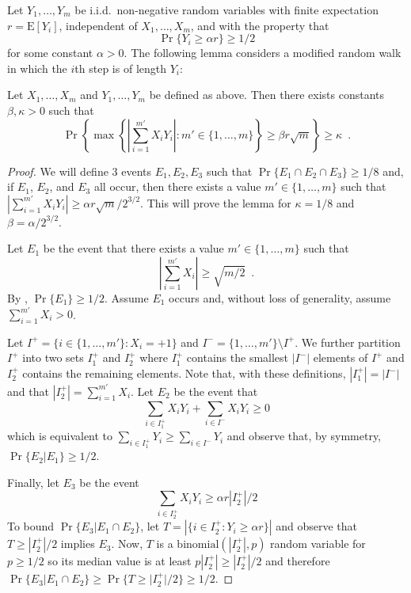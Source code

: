 \documentclass[lotsofwhite]{patmorin}
\newcommand{\E}{\mathrm{E}}
\begin{document}
Let $Y_1,\ldots,Y_m$ be i.i.d.\
non-negative random variables with finite expectation $r=\E[Y_i]$,
independent of $X_1,\ldots,X_m$, and with the
property that 
\[ \Pr\{Y_i \ge \alpha r\} \ge 1/2 \]
for some constant
$\alpha > 0$.  The following lemma considers a modified random walk in
which the $i$th step is of length $Y_i$:
\begin{lem}
Let $X_1,\ldots,X_m$ and $Y_1,\ldots,Y_m$ be defined as above.  Then
there exists constants $\beta,\kappa>0$ such that
\[
  \Pr\left\{\max\left\{
           \left|\sum_{i=1}^{m'} X_iY_i\right| : m'\in\{1,\ldots,m\}\right\}
            \ge \beta r\sqrt{m}\right\} 
     \ge \kappa \enspace .
\]
\end{lem}

\begin{proof}
We will define 3 events $E_1,E_2,E_3$ such that
$\Pr\{E_1\cap E_2\cap E_3\} \ge 1/8$ and, if $E_1$, $E_2$, and $E_3$
all occur, then there exists a value $m'\in\{1,\ldots,m\}$ such that
$\left|\sum_{i=1}^{m'}
X_iY_i\right| \ge \alpha r \sqrt{m}/2^{3/2}$.  This will prove the
lemma for $\kappa = 1/8$ and $\beta = \alpha/2^{3/2}$.

Let $E_1$ be the event that there exists a value $m'\in\{1,\ldots,m\}$
such that 
\[
   \left|\sum_{i=1}^{m'} X_i\right| \ge \sqrt{m/2} \enspace .
\]
By , $\Pr\{E_1\}\ge 1/2$.  Assume $E_1$ occurs
and, without loss of generality, assume $\sum_{i=1}^{m'} X_i > 0$.

Let $I^{+} = \{i\in\{1,\ldots,m'\}: X_i=+1\}$ and
$I^-=\{1,\ldots,m'\}\setminus I^+$.  We further partition $I^+$ into
two sets $I^+_1$ and $I^+_2$ where $I^+_1$ contains the smallest
$|I^-|$ elements of $I^+$ and $I^+_2$ contains the remaining elements.
Note that, with these definitions, $|I^+_1|=|I^-|$ and that
$|I^+_2|=\sum_{i=1}^{m'} X_i$.  Let $E_2$ be the event that
\[
     \sum_{i\in I^+_1}X_iY_i + \sum_{i\in I^-} X_iY_i \ge 0
\]
which is equivalent to $\sum_{i\in I^+_1}Y_i \ge \sum_{i\in I^-} Y_i$
and observe that, by symmetry, $\Pr\{E_2|E_1\}\ge 1/2$.

Finally, let $E_3$ be the event
\[
   \sum_{i\in I^+_2} X_iY_i \ge \alpha r|I^+_2|/2
\]
To bound $\Pr\{E_3|E_1\cap E_2\}$, let $T=\left|\{i\in I^+_2:Y_i\ge
\alpha r\}\right|$ and observe that
$T\ge |I^+_2|/2$ implies $E_3$. Now, $T$ is a
$\mathrm{binomial}(|I^+_2|,p)$ random variable for $p\ge 1/2$ so its
median value is at least $p|I^+_2| \ge |I^+_2|/2$ and therefore
$\Pr\{E_3|E_1\cap E_2\} \ge \Pr\{T\ge |I^+_2|/2\} \ge 1/2$.


\end{proof}
\end{document}
